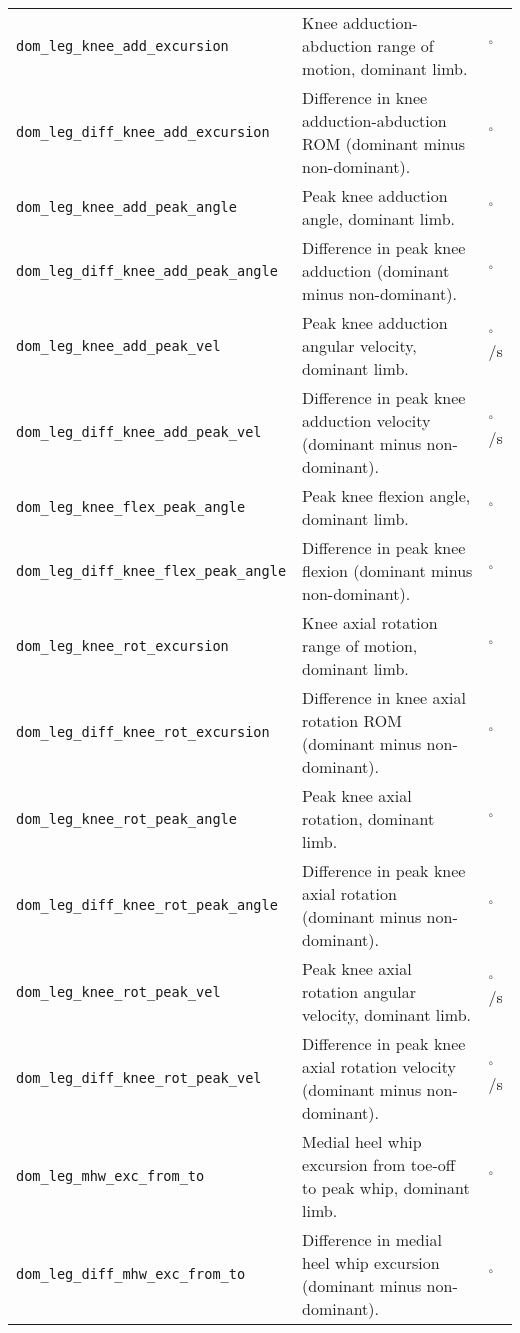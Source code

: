{\begin{longtable}{@{}p{} p{} p{}@{}}
    \texttt{dom\_leg\_knee\_add\_excursion} & Knee adduction-abduction range of motion, dominant limb. & $^\circ$ \\
    \texttt{dom\_leg\_diff\_knee\_add\_excursion} & Difference in knee adduction-abduction ROM (dominant minus non-dominant). & $^\circ$ \\
    \texttt{dom\_leg\_knee\_add\_peak\_angle} & Peak knee adduction angle, dominant limb. & $^\circ$ \\
    \texttt{dom\_leg\_diff\_knee\_add\_peak\_angle} & Difference in peak knee adduction (dominant minus non-dominant). & $^\circ$ \\
    \texttt{dom\_leg\_knee\_add\_peak\_vel} & Peak knee adduction angular velocity, dominant limb. & $^\circ$/s \\
    \texttt{dom\_leg\_diff\_knee\_add\_peak\_vel} & Difference in peak knee adduction velocity (dominant minus non-dominant). & $^\circ$/s \\
    \texttt{dom\_leg\_knee\_flex\_peak\_angle} & Peak knee flexion angle, dominant limb. & $^\circ$ \\
    \texttt{dom\_leg\_diff\_knee\_flex\_peak\_angle} & Difference in peak knee flexion (dominant minus non-dominant). & $^\circ$ \\
    \texttt{dom\_leg\_knee\_rot\_excursion} & Knee axial rotation range of motion, dominant limb. & $^\circ$ \\
    \texttt{dom\_leg\_diff\_knee\_rot\_excursion} & Difference in knee axial rotation ROM (dominant minus non-dominant). & $^\circ$ \\
    \texttt{dom\_leg\_knee\_rot\_peak\_angle} & Peak knee axial rotation, dominant limb. & $^\circ$ \\
    \texttt{dom\_leg\_diff\_knee\_rot\_peak\_angle} & Difference in peak knee axial rotation (dominant minus non-dominant). & $^\circ$ \\
    \texttt{dom\_leg\_knee\_rot\_peak\_vel} & Peak knee axial rotation angular velocity, dominant limb. & $^\circ$/s \\
    \texttt{dom\_leg\_diff\_knee\_rot\_peak\_vel} & Difference in peak knee axial rotation velocity (dominant minus non-dominant). & $^\circ$/s \\
    \texttt{dom\_leg\_mhw\_exc\_from\_to} & Medial heel whip excursion from toe-off to peak whip, dominant limb. & $^\circ$ \\
    \texttt{dom\_leg\_diff\_mhw\_exc\_from\_to} & Difference in medial heel whip excursion (dominant minus non-dominant). & $^\circ$ \\

\end{longtable}}
